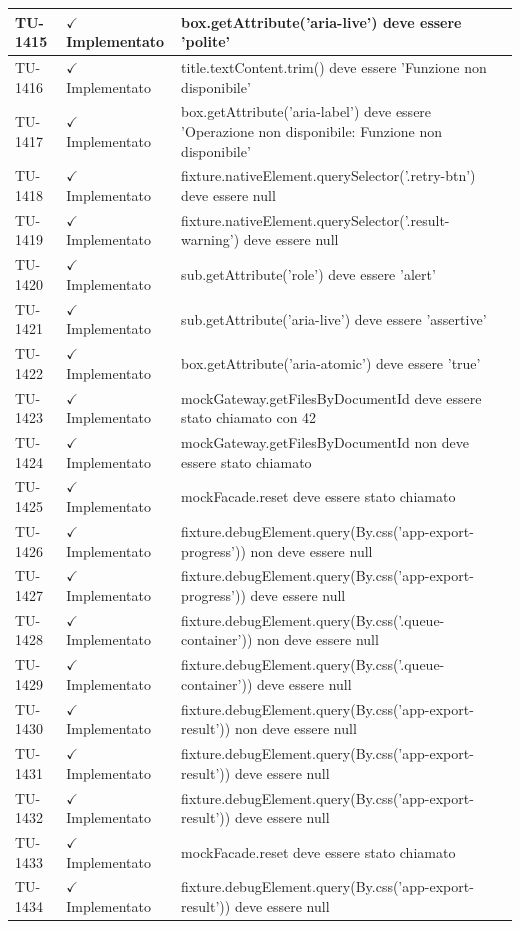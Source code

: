 ﻿\documentclass[a4paper,12pt]{article}
\newcommand{\ok}{\textcolor{green!60!black}{$\checkmark$ Implementato}}
\begin{document}
\begin{longtable}{|p{2cm}|p{3.5cm}|p{9.5cm}|}
\hline
TU-1415 & \ok & box.getAttribute('aria-live') deve essere 'polite' \\
\hline
TU-1416 & \ok & title.textContent.trim() deve essere 'Funzione non disponibile' \\
\hline
TU-1417 & \ok & box.getAttribute('aria-label') deve essere 'Operazione non disponibile: Funzione non disponibile' \\
\hline
TU-1418 & \ok & fixture.nativeElement.querySelector('.retry-btn') deve essere null \\
\hline
TU-1419 & \ok & fixture.nativeElement.querySelector('.result-warning') deve essere null \\
\hline
TU-1420 & \ok & sub.getAttribute('role') deve essere 'alert' \\
\hline
TU-1421 & \ok & sub.getAttribute('aria-live') deve essere 'assertive' \\
\hline
TU-1422 & \ok & box.getAttribute('aria-atomic') deve essere 'true' \\
\hline
TU-1423 & \ok & mockGateway.getFilesByDocumentId deve essere stato chiamato con 42 \\
\hline
TU-1424 & \ok & mockGateway.getFilesByDocumentId non deve essere stato chiamato \\
\hline
TU-1425 & \ok & mockFacade.reset deve essere stato chiamato \\
\hline
TU-1426 & \ok & fixture.debugElement.query(By.css('app-export-progress')) non deve essere null \\
\hline
TU-1427 & \ok & fixture.debugElement.query(By.css('app-export-progress')) deve essere null \\
\hline
TU-1428 & \ok & fixture.debugElement.query(By.css('.queue-container')) non deve essere null \\
\hline
TU-1429 & \ok & fixture.debugElement.query(By.css('.queue-container')) deve essere null \\
\hline
TU-1430 & \ok & fixture.debugElement.query(By.css('app-export-result')) non deve essere null \\
\hline
TU-1431 & \ok & fixture.debugElement.query(By.css('app-export-result')) deve essere null \\
\hline
TU-1432 & \ok & fixture.debugElement.query(By.css('app-export-result')) deve essere null \\
\hline
TU-1433 & \ok & mockFacade.reset deve essere stato chiamato \\
\hline
TU-1434 & \ok & fixture.debugElement.query(By.css('app-export-result')) deve essere null \\

\end{longtable}
\end{document}
